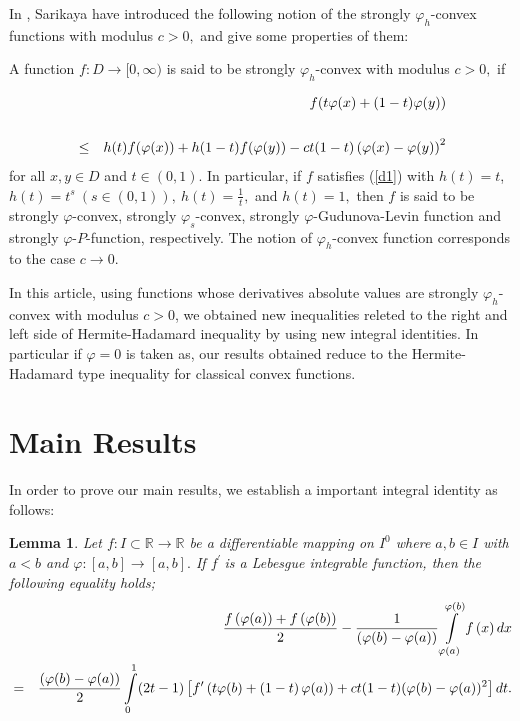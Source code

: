 \documentclass{amsart}
\theoremstyle{plain}
\newtheorem{lemma}{Lemma}
\numberwithin{equation}{section}
\begin{document}
In \cite{sarikaya4} , Sarikaya have introduced the following notion of the
strongly $\varphi _{h}$-convex functions with modulus $c>0,$ and give some
properties of them:

A function $f:D\rightarrow \lbrack 0,\infty )$ is said to be strongly $\varphi _{h}$-convex with modulus $c>0,$ if

\begin{eqnarray}
&&f(t\varphi (x)+(1-t)\varphi (y))  \notag \\
&&  \label{d1} \\
&\leq &h(t)f(\varphi (x))+h(1-t)f(\varphi (y))-ct(1-t)\left( \varphi
(x)-\varphi (y)\right) ^{2}  \notag
\end{eqnarray}for all $x,y\in D$ and $t\in \left( 0,1\right) $. In particular, if $f$
satisfies (\ref{d1}) with $h(t)=t$, $h(t)=t^{s}\ (s\in \left( 0,1\right) ),\
h(t)=\frac{1}{t},$ and $h(t)=1,$ then $f$ is said to be strongly $\varphi $-convex, strongly $\varphi _{s}$-convex, strongly $\varphi $-Gudunova-Levin
function and strongly $\varphi $-$P$-function, respectively. The notion of $\varphi _{h}$-convex function corresponds to the case $c\rightarrow 0$.

In this article, using functions whose derivatives absolute values are
strongly $\varphi _{h}$-convex with modulus $c>0$, we obtained new
inequalities releted to the right and left side of Hermite-Hadamard
inequality by using new integral identities. In particular if $\varphi =0$
is taken as, our results obtained reduce to the Hermite-Hadamard type
inequality for classical convex functions.

\section{Main Results}

In order to prove our main results, we establish a important integral
identity as follows:

\begin{lemma}
\label{z1} Let $f:I\subset 
\mathbb{R}
\rightarrow 
\mathbb{R}
$ be a differentiable mapping on $I^{0}$ where $a,b\in I$ with $a<b$ and $\varphi :\left[ a,b\right] \rightarrow \left[ a,b\right] .$ If $f^{\prime }\ 
$is a Lebesgue integrable function, then the following equality holds;\begin{eqnarray}
&&\frac{f\left( \varphi (a)\right) +f\left( \varphi (b)\right) }{2}-\frac{1}{(\varphi (b)-\varphi (a))}\int\limits_{\varphi (a)}^{\varphi (b)}f\left(
x\right) dx  \label{s1} \\
&=&\dfrac{(\varphi (b)-\varphi (a))}{2}\int\limits_{0}^{1}(2t-1)\left[
f^{\prime }\left( t\varphi (b)+\left( 1-t\right) \varphi (a)\right)
+ct(1-t)(\varphi (b)-\varphi (a))^{2}\right] dt.  \notag
\end{eqnarray}
\end{lemma}
\end{document}
